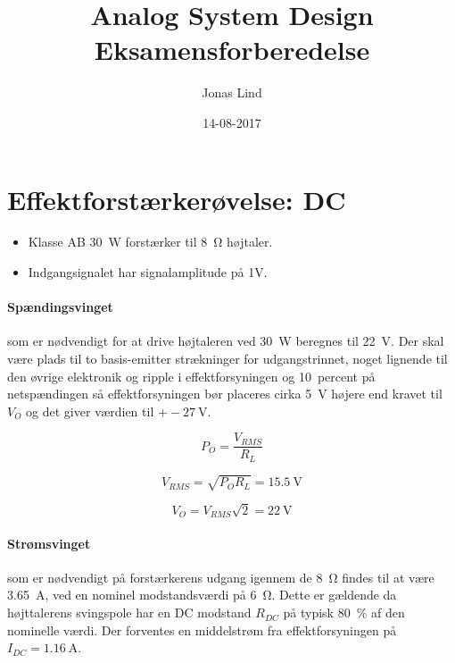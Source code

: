 \documentclass[danish]{article}
\begin{document}
\title{\textbf{Analog System Design} \\Eksamensforberedelse}
\author{Jonas Lind}
\date{14-08-2017}
\maketitle
\section{Effektforstærkerøvelse: DC}
\begin{itemize}
	\item Klasse AB \SI{30}{\watt} forstærker til \SI{8}{\ohm} højtaler.
	\item Indgangsignalet har signalamplitude på 1V.
\end{itemize}

\paragraph{Spændingsvinget} som er nødvendigt for at drive højtaleren ved \SI{30}{\watt} beregnes til \SI{22}{\volt}. Der skal være plads til to basis-emitter strækninger for udgangstrinnet, noget lignende til den øvrige elektronik og ripple i effektforsyningen og  \SI{10}{percent}  på netspændingen så effektforsyningen bør placeres cirka \SI{5}{\volt} højere end kravet til $V_O$ og det giver værdien til $+-\SI{27}{\volt}$.

\begin{equation}
P_O = \dfrac{V_{RMS}}{R_L}
\end{equation}

\begin{equation}
V_{RMS} = \sqrt{P_O R_L} = \SI{15.5}{\volt}
\end{equation}

\begin{equation}
V_O = V_{RMS} \sqrt{2} = \SI{22}{\volt}
\end{equation}

\paragraph{Strømsvinget} som er nødvendigt på forstærkerens udgang igennem de \SI{8}{\ohm} findes til at være \SI{3.65}{\ampere}, ved en nominel modstandsværdi på \SI{6}{\ohm}. Dette er gældende da højttalerens svingspole har en DC modstand $R_{DC}$ på typisk \SI{80}{\percent}  af den nominelle værdi. Der forventes en middelstrøm fra effektforsyningen på $I_{DC} = \SI{1.16}{\ampere}$.
\end{document}
